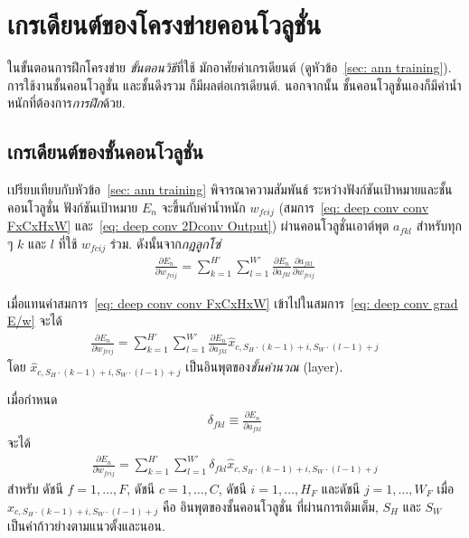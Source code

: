\section{เกรเดียนต์ของโครงข่ายคอนโวลูชั่น}
ในขั้นตอนการฝึกโครงข่าย \textit{ขั้นตอนวิธี}ที่ใช้ มักอาศัยค่าเกรเดียนต์ (ดูหัวข้อ~\ref{sec: ann training}).
การใช้งานชั้นคอนโวลูชั่น และชั้นดึงรวม ก็มีผลต่อเกรเดียนต์.
นอกจากนั้น ชั้นคอนโวลูชั่นเองก็มีค่าน้ำหนักที่ต้องการ\textit{การฝึก}ด้วย.

\subsection{เกรเดียนต์ของชั้นคอนโวลูชั่น}
เปรียบเทียบกับหัวข้อ~\ref{sec: ann training} %
พิจารณาความสัมพันธ์ ระหว่างฟังก์ชันเป้าหมายและชั้นคอนโวลูชั่น 
ฟังก์ชันเป้าหมาย $E_n$ จะขึ้นกับค่าน้ำหนัก $w_{fcij}$ (สมการ~\ref{eq: deep conv conv FxCxHxW} และ~\ref{eq: deep conv 2Dconv Output}) ผ่านคอนโวลูชั่นเอาต์พุต $a_{fkl}$ สำหรับทุก ๆ $k$ และ $l$ ที่ใช้ $w_{fcij}$ ร่วม.
ดังนั้นจาก\textit{กฎลูกโซ่}
\begin{eqnarray}
\frac{\partial E_n}{\partial w_{fcij}} = \sum_{k=1}^{H'} \sum_{l=1}^{W'} \frac{\partial E_n}{\partial a_{fkl}} \frac{\partial a_{fkl}}{\partial w_{fcij}}
\label{eq: deep conv grad E/w}
\end{eqnarray}

เมื่อแทนค่าสมการ~\ref{eq: deep conv conv FxCxHxW} เข้าไปในสมการ~\ref{eq: deep conv grad E/w} จะได้
\begin{eqnarray}
\frac{\partial E_n}{\partial w_{fcij}} = \sum_{k=1}^{H'} \sum_{l=1}^{W'} \frac{\partial E_n}{\partial a_{fkl}} 
\hat{x}_{c, S_H \cdot (k-1)+i, S_W \cdot (l-1)+j}
\label{eq: deep conv grad E/w 1}
\end{eqnarray}
โดย $\hat{x}_{c, S_H \cdot (k-1)+i, S_W \cdot (l-1)+j}$ เป็นอินพุตของ\textit{ชั้นคำนวณ} (layer).


เมื่อกำหนด 
\begin{eqnarray}
\delta_{fkl} \equiv \frac{\partial E_n}{\partial a_{fkl}}
\label{eq: deep conv grad delta}
\end{eqnarray}
%
จะได้
\begin{eqnarray}
\frac{\partial E_n}{\partial w_{fcij}} = \sum_{k=1}^{H'} \sum_{l=1}^{W'} \delta_{fkl} 
\hat{x}_{c, S_H \cdot (k-1)+i, S_W \cdot (l-1)+j}
\label{eq: deep conv grad E/w 2} 
\end{eqnarray}
สำหรับ
ดัชนี $f = 1, \ldots, F$, 
ดัชนี $c = 1, \ldots, C$,
ดัชนี $i = 1, \ldots, H_F$
และดัชนี $j = 1, \ldots, W_F$
เมื่อ $\hat{x}_{c, S_H \cdot (k-1)+i, S_W \cdot (l-1)+j}$ คือ 
อินพุตของชั้นคอนโวลูชั่น ที่ผ่านการเติมเต็ม,
$S_H$ และ $S_W$ เป็นค่าก้าวย่างตามแนวตั้งและนอน.

